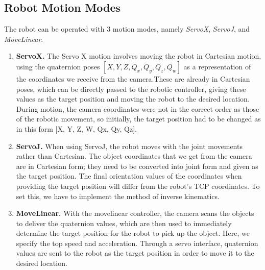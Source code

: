\documentclass[12pt]{article}
\begin{document}
\subsection{Robot Motion Modes}
The robot can be operated with 3 motion modes, namely \textit{ServoX}, \textit{ServoJ}, and \textit{MoveLinear}.\

\begin{enumerate}
    \item \textbf{ServoX.} The Servo X motion involves moving the robot in Cartesian motion, using the quaternion poses $[X, Y, Z, Q_x, Q_y, Q_z, Q_w]$ as a representation of the coordinates we receive from the camera.These are already in Cartesian poses, which can be directly passed to the robotic controller, giving these values as the target position and moving the robot to the desired location. During motion, the camera coordinates were not in the correct order as those of the robotic movement, so initially, the target position had to be changed as in this form [X, Y, Z, W, Qx, Qy, Qz].
    \item \textbf{ServoJ.} When using ServoJ, the robot moves with the joint movements rather than Cartesian. The object coordinates that we get from the camera are in Cartesian form; they need to be converted into joint form and given as the target position. The final orientation values of the coordinates when providing the target position will differ from the robot's TCP coordinates. To set this, we have to implement the method of inverse kinematics.
    \item \textbf{MoveLinear.} With the movelinear controller, the camera scans the objects to deliver the quaternion values, which are then used to immediately determine the target position for the robot to pick up the object. Here, we specify the top speed and acceleration.  Through a servo interface, quaternion values are sent to the robot as the target position in order to move it to the desired location.
\end{enumerate}

\newpage
\end{document}
